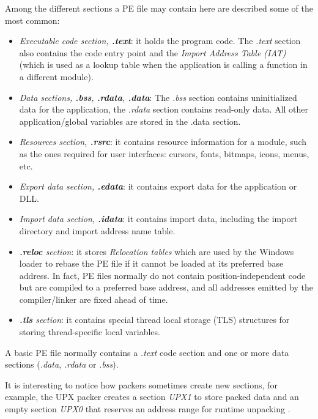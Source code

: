 \documentclass[pdfa%
,cucitura%
]{toptesi}
\begin{document}
Among the different sections a PE file may contain here are described some of the most common:
\begin{itemize}
	\item \textit{Executable code section, \textbf{.text}}: it holds the program code. The \textit{.text} section also contains the code entry point and the \textit{Import Address Table (IAT)} (which is used as a lookup table when the application is calling a function in a different module).
	
	\item \textit{Data sections, \textbf{.bss}, \textbf{.rdata}, \textbf{.data}}: The \textit{.bss} section contains uninitialized data for the application, the \textit{.rdata} section contains read-only data. All other application/global variables are stored in the .data section.
	
	\item \textit{Resources section, \textbf{.rsrc}}: it contains resource information for a module, such as the ones required for user interfaces: cursors, fonts, bitmaps, icons, menus, etc.
	
	\item \textit{Export data section, \textbf{.edata}}: it contains export data for the application or DLL.
	
	\item \textit{Import data section, \textbf{.idata}}: it contains import data, including the import directory and import address name table.
		
	\item \textit{\textbf{.reloc} section}: it stores \textit{Relocation tables} which are used by the Windows loader to rebase the PE file if it cannot be loaded at its preferred base address. In fact, PE files normally do not contain position-independent code but are compiled to a preferred base address, and all addresses emitted by the compiler/linker are fixed ahead of time.
	
	\item \textit{\textbf{.tls} section}: it contains special thread local storage (TLS) structures for storing thread-specific local variables.
\end{itemize}

A basic PE file normally contains a \textit{.text} code section and one or more data sections (\textit{.data}, \textit{.rdata} or \textit{.bss}).

It is interesting to notice how packers sometimes create new sections, for example, the UPX packer creates a section \textit{UPX1} to store packed data and an empty section \textit{UPX0} that reserves an address range for runtime unpacking \cite{AndersonEMBER}.
\end{document}
